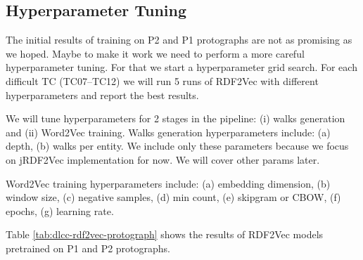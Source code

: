\documentclass[a4paper,oneside,bibliography=totoc]{scrartcl}
\begin{document}
\subsection{Hyperparameter Tuning}

The initial results of training on P2 and P1 protographs are not as promising as we hoped. Maybe to make it work we need to perform a more careful hyperparameter tuning. 
For that we start a hyperparameter grid search. For each difficult TC (TC07--TC12) we will run 5 runs of RDF2Vec with different hyperparameters and report the best results.

We will tune hyperparameters for 2 stages in the pipeline: (i) walks generation and (ii) Word2Vec training. 
Walks generation hyperparameters include: (a) depth, (b) walks per entity. We include only these parameters because we focus on jRDF2Vec implementation for now. 
We will cover other params later. 

Word2Vec training hyperparameters include: (a) embedding dimension, (b) window size, (c) negative samples, (d) min count, (e) skipgram or CBOW, (f) epochs, (g) learning rate.

Table \ref{tab:dlcc-rdf2vec-protograph} shows the results of RDF2Vec models pretrained on P1 and P2 protographs.
\end{document}

